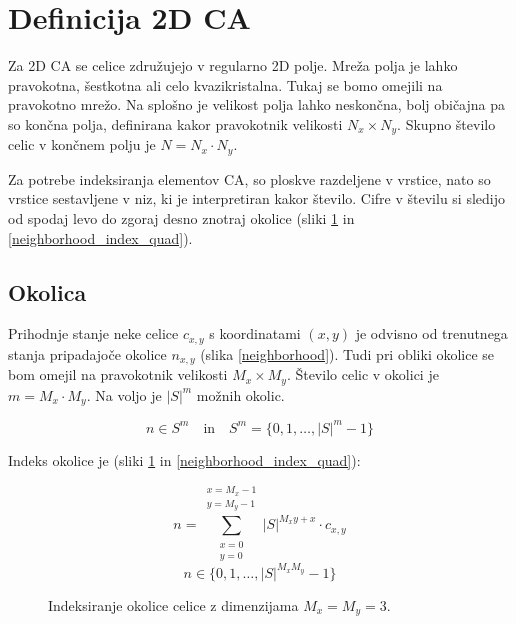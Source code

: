 \documentclass[12pt,a4paper,openany,twoside]{book}
\begin{document}
\section{Definicija 2D CA}

Za 2D CA se celice združujejo v regularno 2D polje.
Mreža polja je lahko pravokotna, šestkotna ali celo kvazikristalna.
Tukaj se bomo omejili na pravokotno mrežo.
Na splošno je velikost polja lahko neskončna,
bolj običajna pa so končna polja,
definirana kakor pravokotnik velikosti \(N_x \times N_y\).
Skupno število celic v končnem polju je \(N=N_x \cdot N_y\).

Za potrebe indeksiranja elementov CA, so ploskve razdeljene v vrstice,
nato so vrstice sestavljene v niz, ki je interpretiran kakor število.
Cifre v številu si sledijo od spodaj levo do zgoraj desno znotraj okolice
(sliki \ref{neighborhood_index_moore} in \ref{neighborhood_index_quad}).

\subsection{Okolica}

Prihodnje stanje neke celice \(c_{x,y}\) s koordinatami \((x,y)\)
je odvisno od trenutnega stanja pripadajoče okolice \(n_{x,y}\) (slika \ref{neighborhood}).
Tudi pri obliki okolice se bom omejil na pravokotnik velikosti \(M_x \times M_y\).
Število celic v okolici je \(m=M_x \cdot M_y\).
Na voljo je \({\lvert S \rvert}^m\) možnih okolic.

\begin{equation}
n \in S^m
\quad \textrm{in} \quad
S^m = \{ 0, 1, \ldots, {\lvert S \rvert}^m -1 \}
\end{equation}

Indeks okolice je (sliki \ref{neighborhood_index_moore} in \ref{neighborhood_index_quad}):

\begin{equation}
n = \sum_{\substack{x=0 \\ y=0}}^{\substack{x=M_x-1 \\ y=M_y-1}} |S|^{M_x y + x} \cdot c_{x,y}
\end{equation}
\begin{equation}
n \in \{0, 1, \ldots, |S|^{M_x M_y}-1\}
\end{equation}

\begin{figure}[htb]
\centerline{}
\caption[Indeksiranje okolice \(3 \times 3\).]{Indeksiranje okolice celice z dimenzijama \(M_x=M_y=3\).}
\label{neighborhood_index_moore}
\end{figure}
\end{document}
